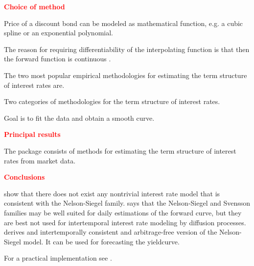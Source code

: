 \textcolor{red}{\textbf{Choice of method}}

\cite{Nelson1987, Svensson1994, McCulloch1975}

Price of a discount bond can be modeled as mathematical function, e.g. a cubic spline or an exponential polynomial.

The reason for requiring differentiability of the interpolating function is that then the forward function is continuous \citep[see][p. 97]{Hagan2006}.

The two most popular empirical methodologies for estimating the term structure of interest rates are.

Two categories of methodologies for the term structure of interest rates.

Goal is to fit the data and obtain a smooth curve.

\textcolor{red}{\textbf{Principal results}}

The  package  consists of methods for estimating the term structure of interest rates from market data.

\textcolor{red}{\textbf{Conclusions}}

\cite{Filipovic1999, Bjoerk1999} show that there does not exist any nontrivial interest rate model that is consistent with the Nelson-Siegel family. \cite{Filipovic2000} says that the Nelson-Siegel and Svensson families may be well suited for daily estimations of the forward curve, but they are best not used for intertemporal interest rate modeling by diffusion processes. \cite{Krippner2006} derives and intertemporally consistent and arbitrage-free version of the Nelson-Siegel model. It can be used for forecasting the yieldcurve.

For a practical implementation see \cite{Bolder2006}. 


